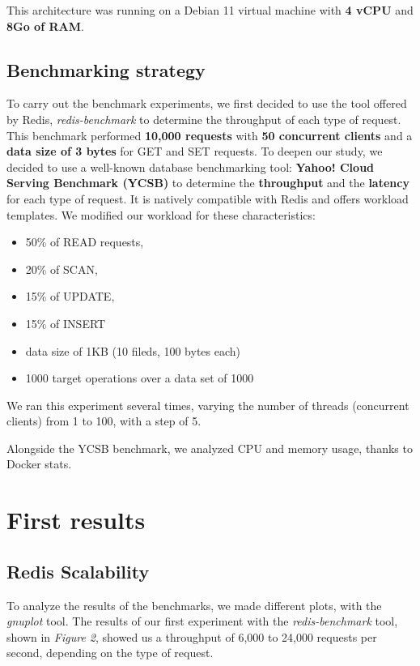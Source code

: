 \documentclass[runningheads]{llncs}
\begin{document}
This architecture was running on a Debian 11 virtual machine with \textbf{4 vCPU} and \textbf{8Go of RAM}.

\subsection{Benchmarking strategy}
To carry out the benchmark experiments, we first decided to use the tool offered by Redis, \textit{redis-benchmark} to determine the throughput of each type of request. This benchmark performed \textbf{10,000 requests} with \textbf{50 concurrent clients} and a \textbf{data size of 3 bytes} for GET and SET requests.
To deepen our study, we decided to use a well-known database benchmarking tool: \textbf{Yahoo! Cloud Serving Benchmark (YCSB)} to determine the \textbf{throughput} and the \textbf{latency} for each type of request. It is natively compatible with Redis and offers workload templates. We modified our workload for these characteristics:
\begin{itemize}
    \item 50\% of READ requests,
    \item 20\% of SCAN,
    \item 15\% of UPDATE,
    \item 15\% of INSERT
    \item data size of 1KB (10 fileds, 100 bytes each)
    \item 1000 target operations over a data set of 1000
\end{itemize}

We ran this experiment several times, varying the number of threads (concurrent clients) from 1 to 100, with a step of 5.

Alongside the YCSB benchmark, we analyzed CPU and memory usage, thanks to Docker stats.

\newpage
\section{First results}
\subsection{Redis Scalability}

To analyze the results of the benchmarks, we made different plots, with the \textit{gnuplot} tool.
The results of our first experiment with the \textit{redis-benchmark} tool, shown in \textit{Figure 2}, showed us a throughput of 6,000 to 24,000 requests per second, depending on the type of request.
\end{document}
